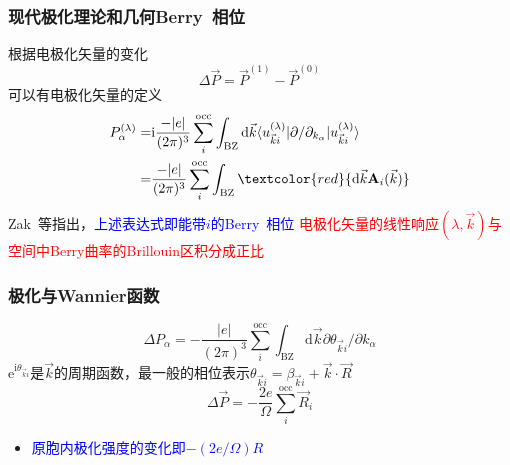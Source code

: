 \frame
{
	\frametitle{现代极化理论和几何\textrm{Berry~}相位}
	根据电极化矢量的变化
	\begin{displaymath}
		\Delta\vec P=\vec P^{(1)}-\vec P^{(0)}	
	\end{displaymath}
	可以有电极化矢量的定义
	\begin{displaymath}
		\begin{aligned}
			P_{\alpha}^{(\lambda)}=&\mathrm{i}\frac{-|e|}{(2\pi)^3}\sum_i^{\mathrm{occ}}\int_{\mathrm{BZ}}\mathrm{d}\vec k\langle u_{\vec k i}^{(\lambda)}|\partial/\partial_{k_{\alpha}}|u_{\vec k i}^{(\lambda)}\rangle\\
			=&\frac{-|e|}{(2\pi)^3}\sum_i^{\mathrm{occ}}\int_{\mathrm{BZ}}\textcolor{red}{\mathrm{d}\vec k\mathbf{A}_i(\vec k)}
		\end{aligned}
	\end{displaymath}
	\textrm{Zak~}等指出，\textcolor{blue}{上述表达式即能带$i$的\textrm{Berry~}相位}%
\vskip 8pt
	\textcolor{red}{电极化矢量的线性响应$(\lambda,\vec k)$与空间中\textrm{Berry}曲率的\textrm{Brillouin}区积分成正比}
}


\frame
{
	\frametitle{极化与\textrm{Wannier}函数}
	\begin{displaymath}
		\Delta P_{\alpha}=-\frac{|e|}{(2\pi)^3}\sum_i^{\mathrm{occ}}\int_{\mathrm{BZ}}\mathrm{d}\vec k\partial\theta_{\vec k i}/\partial k_{\alpha}
	\end{displaymath}
	$\mathrm{e}^{\mathrm{i}\theta_{\vec k i}}$是$\vec k$的周期函数，最一般的相位表示$\theta_{\vec k i}=\beta_{\vec k i}+\vec k\cdot\vec R$
	\begin{displaymath}
		\Delta\vec P=-\frac{2e}{\Omega}\sum_i^{\mathrm{occ}}\vec R_i
	\end{displaymath}
	\textcolor{red}{\fontsize{9.0pt}{6.2pt}}
	\begin{itemize}
		\item \textcolor{blue}{原胞内极化强度的变化即$-(2e/\Omega)R$}
	\end{itemize}
}

